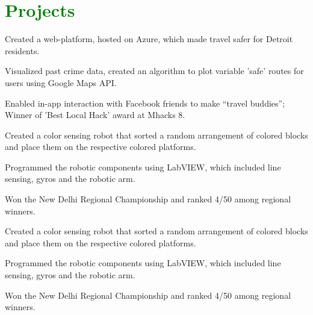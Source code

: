\documentclass[letterpaper]{deedy-resume-openfont} %
\begin{document}
\begin{minipage}[t]{0.66\textwidth}
\section{\textcolor{GREEN}{Projects}}

\begin{tightemize}
\item Created a web-platform, hosted on Azure, which made travel safer for Detroit residents.
\item Visualized past crime data, created an algorithm to plot variable 'safe' routes for users using Google Maps API.
\item Enabled in-app interaction with Facebook friends to make “travel buddies”; Winner of 'Best Local Hack' award at Mhacks 8.
\end{tightemize}

\sectionsep %

\begin{tightemize}
\item Created a color sensing robot that sorted a random arrangement of colored blocks and place them on the respective colored platforms.
\item Programmed the robotic components using LabVIEW, which included line sensing, gyros and the robotic arm.
\item Won the New Delhi Regional Championship and ranked 4/50 among regional winners.
\end{tightemize}

\sectionsep %

\begin{tightemize}
\item Created a color sensing robot that sorted a random arrangement of colored blocks and place them on the respective colored platforms.
\item Programmed the robotic components using LabVIEW, which included line sensing, gyros and the robotic arm.
\item Won the New Delhi Regional Championship and ranked 4/50 among regional winners.
\end{tightemize}
\sectionsep %


\end{minipage}
\end{document}
